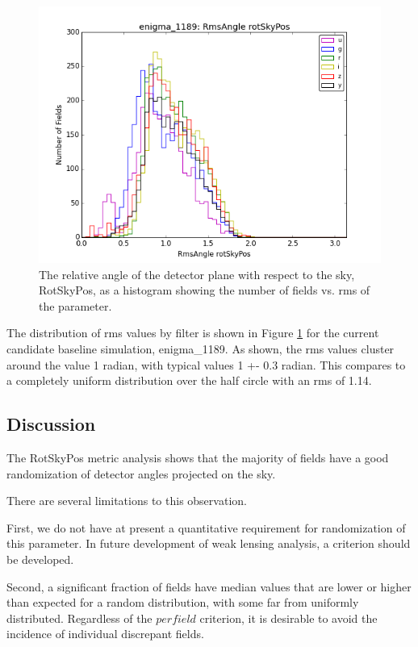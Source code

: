 \begin{figure}
\includegraphics[width=5.0in]{enigma1189RmsAnglerotSkyPosugrizybandallpropsOPSIComboHistogram.png}
\caption{The relative angle of the detector plane with respect to the sky, RotSkyPos, as a histogram showing the number of fields vs. rms of the parameter.}
\label{RotSkyPos}
\end{figure}

The distribution of rms values by filter is shown in Figure \ref{RotSkyPos} for the current candidate baseline simulation, enigma\_1189.  As shown, the rms values cluster around the value 1 radian,  with typical values 1 +- 0.3 radian.  This compares to a completely uniform distribution over the half circle with an rms of 1.14.  

\subsection{Discussion}

The RotSkyPos metric analysis shows that the majority of fields have a good randomization of detector angles projected on the sky.

There are several limitations to this observation.

First, we do not have at present a quantitative requirement for randomization of this parameter.  In future development of weak lensing analysis, a criterion should be developed.

Second, a significant fraction of fields  have median values that are lower or higher than expected for a random distribution, with some far from uniformly distributed.  Regardless of the $per field$ criterion, it is desirable to avoid the incidence of individual discrepant fields.

